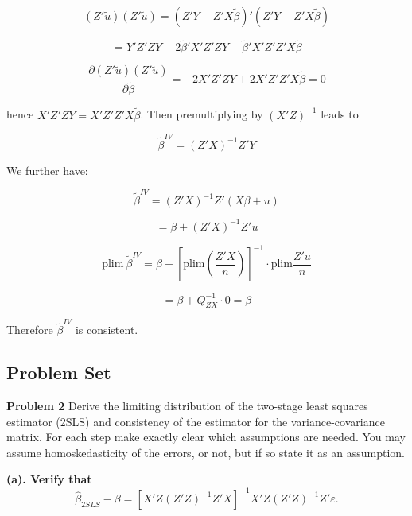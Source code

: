 \documentclass[12pt, oneside]{article}
\begin{document}
\[
(Z'\tilde{u})(Z'\tilde{u}) = (Z'Y - Z'X\tilde{\beta})'(Z'Y - Z'X\tilde{\beta})
\]

\[
= Y'Z'Z Y - 2\tilde{\beta}'X'Z'Z Y + \tilde{\beta}'X'Z'Z'X\tilde{\beta}
\]

\[
\frac{\partial (Z'\tilde{u})(Z'\tilde{u})}{\partial \tilde{\beta}} = -2X'Z'Z Y + 2X'Z'Z'X\tilde{\beta} = 0
\]

hence \( X'Z'Z Y = X'Z'Z'X\tilde{\beta} \). Then premultiplying by \( (X'Z)^{-1} \) leads to

\[
\tilde{\beta}^{IV} = (Z'X)^{-1}Z'Y
\]

We further have:

\[
\tilde{\beta}^{IV} = (Z'X)^{-1}Z'(X\beta + u)
\]

\[
= \beta + (Z'X)^{-1}Z'u
\]

\[
\text{plim} \ \tilde{\beta}^{IV} = \beta + \left[ \text{plim} \left( \frac{Z'X}{n} \right) \right]^{-1} \cdot \text{plim} \frac{Z'u}{n}
\]

\[
= \beta + Q_{ZX}^{-1} \cdot 0 = \beta
\]

Therefore \( \tilde{\beta}^{IV} \) is consistent.


\subsection{Problem Set}

\textbf*{Problem 2}
Derive the limiting distribution of the two-stage least squares estimator (2SLS) and consistency of the estimator for the variance-covariance matrix. For each step make exactly clear which assumptions are needed. You may assume homoskedasticity of the errors, or not, but if so state it as an assumption.

\textbf{(a). Verify that}
\[
\hat{\beta}_{2SLS} - \beta = \left[ X'Z(Z'Z)^{-1}Z'X \right]^{-1} X'Z(Z'Z)^{-1}Z'\varepsilon.
\]
\end{document}
